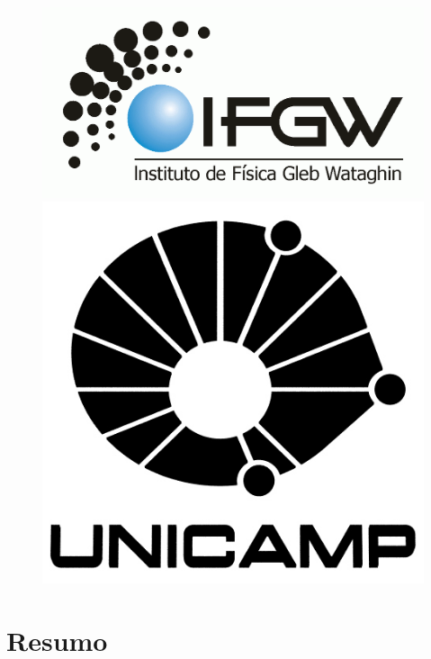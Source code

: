 \documentclass[a4paper]{article}
\begin{document}
	\begin{figure}[!ht]
		\begin{centering}
			\includegraphics[clip,scale=0.4]{logo-ifgw} 
		\par\end{centering}

		\vspace*{1cm}

		\centering{}
			\includegraphics[clip,scale=0.3]{logo-unicamp-name-line-blk-blk-0480} 
	\end{figure}


	\newpage{}


	\section{Resumo}
\end{document}
